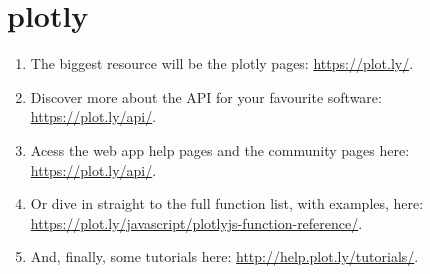 \documentclass[a4paper]{article}
\begin{document}
    \section{plotly}
    \begin{enumerate}
        \item The biggest resource will be the plotly pages: \url{https://plot.ly/}.\\
        \item Discover more about the API for your favourite software: \url{https://plot.ly/api/}.\\
        \item Acess the web app help pages and the community pages here: \url{https://plot.ly/api/}.\\
        \item Or dive in straight to the full function list, with examples, here: \url{https://plot.ly/javascript/plotlyjs-function-reference/}.\\
        \item And, finally, some tutorials here: \url{http://help.plot.ly/tutorials/}.\\
    \end{enumerate}
\end{document}

